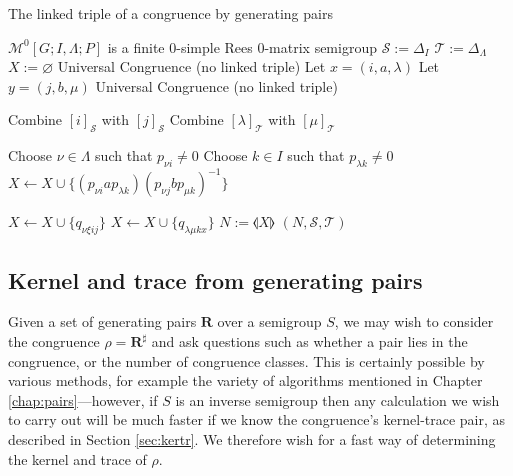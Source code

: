 \begin{algorithm}
\caption{The linked triple of a congruence by generating pairs}
\label{alg:pairs-to-linked-triple}
\begin{algorithmic}[1]
    \Require $\mathcal{M}^0[G;I,\Lambda;P]$ is a finite 0-simple Rees 0-matrix semigroup
      \State $\mathcal{S} := \Delta_I$
      \State $\mathcal{T} := \Delta_\Lambda$
      \State $X := \varnothing$
          \State \Continue
          \State \Return Universal Congruence (no linked triple)
        \EndIf
        \State Let $x=(i,a,\lambda)$
        \State Let $y=(j,b,\mu)$
          \State \Return Universal Congruence (no linked triple)
        \EndIf

        \State Combine $[i]_\mathcal{S}$ with $[j]_\mathcal{S}$
        \State Combine $[\lambda]_\mathcal{T}$ with $[\mu]_\mathcal{T}$

        \State Choose $\nu \in \Lambda$ such that $p_{\nu i} \neq 0$
        \State Choose $k \in I$ such that $p_{\lambda k} \neq 0$
        \State $X \gets X \cup \{(p_{\nu i}ap_{\lambda k})(p_{\nu j}bp_{\mu k})^{-1}\}$

          \State $X \gets X \cup \{q_{\nu \xi i j}\}$
        \EndFor
          \State $X \gets X \cup \{q_{\lambda \mu k x}\}$
        \EndFor
      \EndFor
      \State $N := \llangle X \rrangle$
      \State \Return $(N,\mathcal{S},\mathcal{T})$
    \EndProcedure
\end{algorithmic}
\end{algorithm}

\subsection{Kernel and trace from generating pairs}
\label{sec:pairs-to-kertr}

Given a set of generating pairs $\mathbf{R}$ over a semigroup $S$, we may wish
to consider the congruence $\rho = \mathbf{R}^\sharp$ and ask questions such as
whether a pair lies in the congruence, or the number of congruence classes.
This is certainly possible by various methods, for example the variety of
algorithms mentioned in Chapter \ref{chap:pairs}---however, if $S$ is an inverse
semigroup then any calculation we wish to carry out will be much faster if we
know the congruence's kernel-trace pair, as described in Section
\ref{sec:kertr}.  We therefore wish for a fast way of determining the kernel and
trace of $\rho$.

